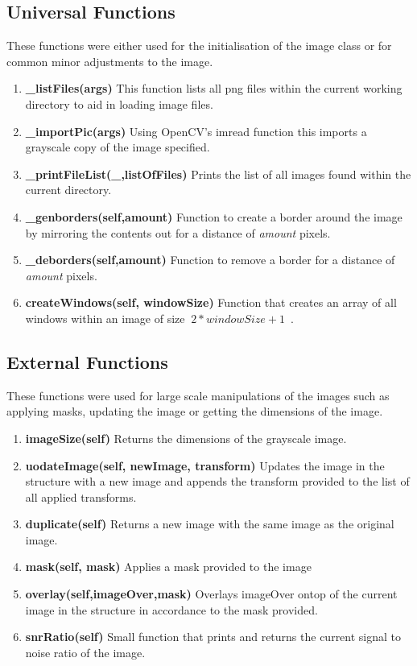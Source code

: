 \documentclass{article}
\begin{document}
\subsection{Universal Functions}
These functions were either used for the initialisation of the image class or for common minor adjustments to the image.
\begin{enumerate}
	\item{\textbf{\_listFiles(\*args)}} This function lists all png files within the current working directory to aid in loading image files.
	\item{\textbf{\_importPic(\*args)}} Using OpenCV's imread function this imports a grayscale copy of the image specified.
	\item{\textbf{\_printFileList(\_,listOfFiles)}} Prints the list of all images found within the current directory.
	\item{\textbf{\_genborders(self,amount)}} Function to create a border around the image by mirroring the contents out for a distance of \textit{amount} pixels.
	\item{\textbf{\_deborders(self,amount)}} Function to remove a border for a distance of \textit{amount} pixels.
	\item{\textbf{createWindows(self, windowSize)}} Function that creates an array of all windows within an image of size $\ 2*windowSize +1 $\ .
\end{enumerate}

\subsection{External Functions}
These functions were used for large scale manipulations of the images such as applying masks, updating the image or getting the dimensions of the image.
\begin{enumerate}
	\item{\textbf{imageSize(self)}} Returns the dimensions of the grayscale image.
	\item{\textbf{uodateImage(self, newImage, transform)}} Updates the image in the structure with a new image and appends the transform provided to the list of all applied transforms.
	\item{\textbf{duplicate(self)}} Returns a new image with the same image as the original image. 
	\item{\textbf{mask(self, mask)}} Applies a mask provided to the image
	\item{\textbf{overlay(self,imageOver,mask)}} Overlays imageOver ontop of the current image in the structure in accordance to the mask provided.
	\item{\textbf{snrRatio(self)}} Small function that prints and returns the current signal to noise ratio of the image.
\end{enumerate}
\end{document}
